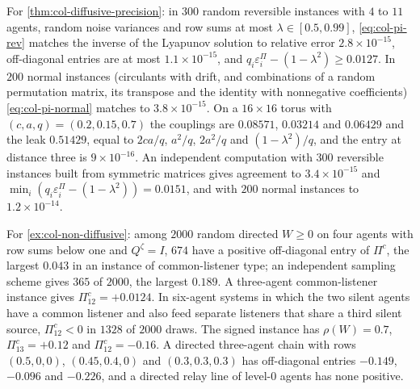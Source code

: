 \begin{numcheck}\label{chk:col-diffusive}
For \cref{thm:col-diffusive-precision}: in $300$ random reversible instances with $4$ to $11$ agents, random noise variances and row sums at most $\lambda\in[0.5,0.99]$, \eqref{eq:col-pi-rev} matches the inverse of the Lyapunov solution to relative error $2.8\times10^{-15}$, off-diagonal entries are at most $1.1\times10^{-15}$, and $q_i\varepsilon^\Pi_i-(1-\lambda^2)\ge0.0127$. In $200$ normal instances (circulants with drift, and combinations of a random permutation matrix, its transpose and the identity with nonnegative coefficients) \eqref{eq:col-pi-normal} matches to $3.8\times10^{-15}$. On a $16\times16$ torus with $(c,a,q)=(0.2,0.15,0.7)$ the couplings are $0.08571$, $0.03214$ and $0.06429$ and the leak $0.51429$, equal to $2ca/q$, $a^2/q$, $2a^2/q$ and $(1-\lambda^2)/q$, and the entry at distance three is $9\times10^{-16}$. An independent computation with $300$ reversible instances built from symmetric matrices gives agreement to $3.4\times10^{-15}$ and $\min_i(q_i\varepsilon^\Pi_i-(1-\lambda^2))=0.0151$, and with $200$ normal instances to $1.2\times10^{-14}$.
\end{numcheck}

\begin{numcheck}\label{chk:col-non-diffusive}
For \cref{ex:col-non-diffusive}: among $2000$ random directed $W\ge0$ on four agents with row sums below one and $Q^{\zeta}=I$, $674$ have a positive off-diagonal entry of $\Pi^c$, the largest $0.043$ in an instance of common-listener type; an independent sampling scheme gives $365$ of $2000$, the largest $0.189$. A three-agent common-listener instance gives $\Pi^c_{12}=+0.0124$. In six-agent systems in which the two silent agents have a common listener and also feed separate listeners that share a third silent source, $\Pi^c_{12}<0$ in $1328$ of $2000$ draws. The signed instance has $\rho(W)=0.7$, $\Pi^c_{13}=+0.12$ and $\Pi^c_{12}=-0.16$. A directed three-agent chain with rows $(0.5,0,0)$, $(0.45,0.4,0)$ and $(0.3,0.3,0.3)$ has off-diagonal entries $-0.149$, $-0.096$ and $-0.226$, and a directed relay line of level-0 agents has none positive.
\end{numcheck}

